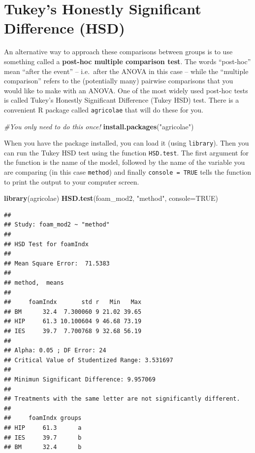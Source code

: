\documentclass[
  a4paperpaper,
]{book}
\newenvironment{Shaded}{\begin{snugshade}}{\end{snugshade}}
\newcommand{\CommentTok}[1]{\textcolor[rgb]{0.56,0.35,0.01}{\textit{#1}}}
\newcommand{\DataTypeTok}[1]{\textcolor[rgb]{0.13,0.29,0.53}{#1}}
\newcommand{\KeywordTok}[1]{\textcolor[rgb]{0.13,0.29,0.53}{\textbf{#1}}}
\newcommand{\NormalTok}[1]{#1}
\newcommand{\OtherTok}[1]{\textcolor[rgb]{0.56,0.35,0.01}{#1}}
\newcommand{\StringTok}[1]{\textcolor[rgb]{0.31,0.60,0.02}{#1}}
\begin{document}
\hypertarget{tukeys-honestly-significant-difference-hsd}{%
\section{Tukey's Honestly Significant Difference (HSD)}\label{tukeys-honestly-significant-difference-hsd}}

An alternative way to approach these comparisons between groups is to use something called a \textbf{post-hoc multiple comparison test}. The words ``post-hoc'' mean ``after the event'' -- i.e.~after the ANOVA in this case -- while the ``multiple comparison'' refers to the (potentially many) pairwise comparisons that you would like to make with an ANOVA. One of the most widely used post-hoc tests is called Tukey's Honestly Significant Difference (Tukey HSD) test. There is a convenient R package called \texttt{agricolae} that will do these for you.

\begin{Shaded}
\begin{Highlighting}[]
\CommentTok{\#You only need to do this once!}
\KeywordTok{install.packages}\NormalTok{(}\StringTok{"agricolae"}\NormalTok{)}
\end{Highlighting}
\end{Shaded}

When you have the package installed, you can load it (using \texttt{library}). Then you can run the Tukey HSD test using the function \texttt{HSD.test}. The first argument for the function is the name of the model, followed by the name of the variable you are comparing (in this case \texttt{method}) and finally \texttt{console\ =\ TRUE} tells the function to print the output to your computer screen.

\begin{Shaded}
\begin{Highlighting}[]
\KeywordTok{library}\NormalTok{(agricolae)}
\KeywordTok{HSD.test}\NormalTok{(foam\_mod2, }\StringTok{"method"}\NormalTok{, }\DataTypeTok{console=}\OtherTok{TRUE}\NormalTok{)}
\end{Highlighting}
\end{Shaded}

\begin{verbatim}
## 
## Study: foam_mod2 ~ "method"
## 
## HSD Test for foamIndx 
## 
## Mean Square Error:  71.5383 
## 
## method,  means
## 
##     foamIndx       std r   Min   Max
## BM      32.4  7.300060 9 21.02 39.65
## HIP     61.3 10.100604 9 46.68 73.19
## IES     39.7  7.700768 9 32.68 56.19
## 
## Alpha: 0.05 ; DF Error: 24 
## Critical Value of Studentized Range: 3.531697 
## 
## Minimun Significant Difference: 9.957069 
## 
## Treatments with the same letter are not significantly different.
## 
##     foamIndx groups
## HIP     61.3      a
## IES     39.7      b
## BM      32.4      b
\end{verbatim}
\end{document}
